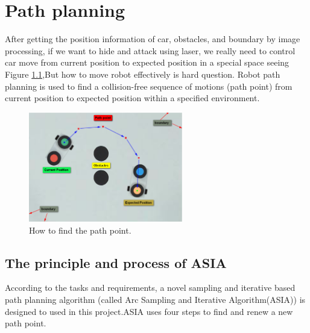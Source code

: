 \chapter{Path planning}
\label{cha:PathPlaning}

After getting the position information of car, obstacles, and boundary by image processing, if we want to hide and attack using laser, we really need to control car move from current position to expected position in a special space seeing Figure \ref{pathpoint},But how to move robot effectively is hard question. Robot path planning is used to find a collision-free sequence of motions (path point) from current position to expected position within a specified environment.

\begin{figure}[thb]
    \centering
    \includegraphics[width=0.6\textwidth]{images/PathPlaningPathPoint.png}
    \caption[How to find the path point]{How to find the path point.}\label{pathpoint}
\end{figure}



\section{The principle and process of ASIA}

According to the tasks and requirements, a novel sampling and iterative based path planning algorithm (called Arc Sampling and Iterative Algorithm(ASIA)) is designed to used in this project.ASIA uses four steps to find and renew a new path point.


